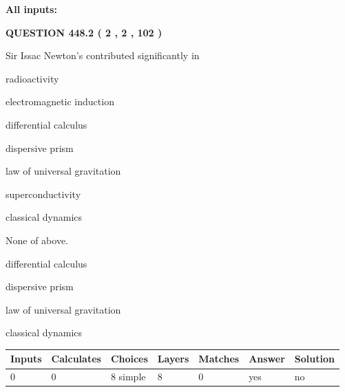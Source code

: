 \documentclass[12pt]{article}
\begin{document}
   
   
   
\noindent{}
   
   
   
   
\noindent\vspace{0.1in}\hspace{-0.08in} {\textbf{\Large{All inputs: }}}
   
   
  
\vspace{0.2in}
  
{\textbf{\Large{QUESTION
448.2 
 ( 2 , 2 , 102 )
}}}
  
  
Sir Issac Newton's contributed significantly in
 
 
radioactivity
 
 
electromagnetic induction
 
 
differential calculus
 
 
dispersive prism
 
 
law of universal gravitation
 
 
superconductivity
 
 
classical dynamics
 
 
 None of above.
 
 
\noindent{}
 
 
differential calculus
 
 
dispersive prism
 
 
law of universal gravitation
 
 
classical dynamics
 
 
\noindent{}
 
 
   
   
   
   
\noindent\begin{tabular}{|l|l|l|l|l|l|l|}
 \hline
Inputs & Calculates & Choices & Layers & Matches & Answer & Solution \\ \hline
 0  & 
 0  & 
 8
  simple  
  & 
 8  & 
 0  & 
  yes & 
  no 
  \\ \hline
 \end{tabular}
   
\end{document}
